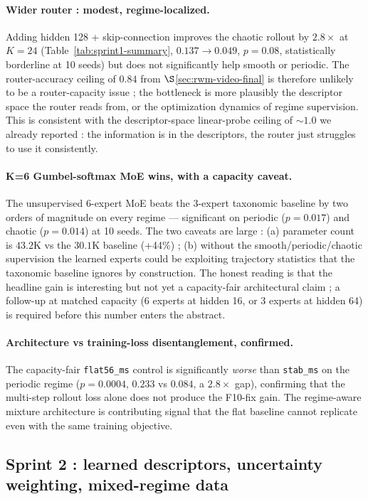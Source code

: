 \documentclass[11pt,a4paper]{article}
\begin{document}
\paragraph{Wider router : modest, regime-localized.}
Adding hidden 128 + skip-connection improves the chaotic rollout by
$2.8{\times}$ at $K{=}24$ (Table~\ref{tab:sprint1-summary}, $0.137 \to
0.049$, $p{=}0.08$, statistically borderline at 10 seeds) but does
not significantly help smooth or periodic. The router-accuracy ceiling
of $0.84$ from $\S$\ref{sec:rwm-video-final} is therefore unlikely to
be a router-capacity issue ; the bottleneck is more plausibly the
descriptor space the router reads from, or the optimization dynamics
of regime supervision. This is consistent with the descriptor-space
linear-probe ceiling of $\sim 1.0$ we already reported : the
information is in the descriptors, the router just struggles to use
it consistently.

\paragraph{K{=}6 Gumbel-softmax MoE wins, with a capacity caveat.}
The unsupervised 6-expert MoE beats the 3-expert taxonomic baseline
by two orders of magnitude on every regime --- significant on
periodic ($p{=}0.017$) and chaotic ($p{=}0.014$) at 10 seeds. The
two caveats are large : (a) parameter count is $43.2$K vs the
$30.1$K baseline (+44\%) ; (b) without the smooth/periodic/chaotic
supervision the learned experts could be exploiting trajectory
statistics that the taxonomic baseline ignores by construction. The
honest reading is that the headline gain is interesting but not yet
a capacity-fair architectural claim ; a follow-up at matched
capacity (6 experts at hidden 16, or 3 experts at hidden 64) is
required before this number enters the abstract.

\paragraph{Architecture vs training-loss disentanglement, confirmed.}
The capacity-fair \texttt{flat56\_ms} control is significantly
\emph{worse} than \texttt{stab\_ms} on the periodic regime
($p{=}0.0004$, $0.233$ vs $0.084$, a $2.8{\times}$ gap), confirming
that the multi-step rollout loss alone does not produce the F10-fix
gain. The regime-aware mixture architecture is contributing signal
that the flat baseline cannot replicate even with the same training
objective.

\subsection{Sprint 2 : learned descriptors, uncertainty weighting, mixed-regime data}
\label{sec:rwm-sprint2}
\end{document}
